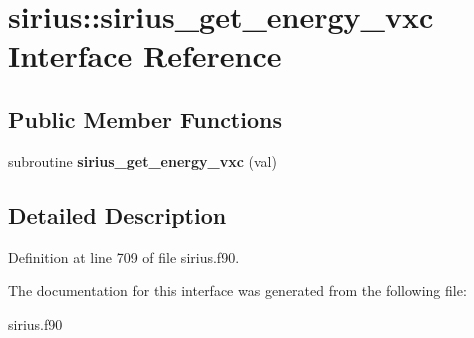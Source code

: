 \hypertarget{interfacesirius_1_1sirius__get__energy__vxc}{}\section{sirius\+:\+:sirius\+\_\+get\+\_\+energy\+\_\+vxc Interface Reference}
\label{interfacesirius_1_1sirius__get__energy__vxc}
\subsection*{Public Member Functions}
\begin{DoxyCompactItemize}
\item 
\hypertarget{interfacesirius_1_1sirius__get__energy__vxc_a87d1d9e6855dfec99bf8c07b29b6944e}{}subroutine {\bfseries sirius\+\_\+get\+\_\+energy\+\_\+vxc} (val)\label{interfacesirius_1_1sirius__get__energy__vxc_a87d1d9e6855dfec99bf8c07b29b6944e}

\end{DoxyCompactItemize}


\subsection{Detailed Description}


Definition at line 709 of file sirius.\+f90.



The documentation for this interface was generated from the following file\+:\begin{DoxyCompactItemize}
\item 
sirius.\+f90\end{DoxyCompactItemize}
